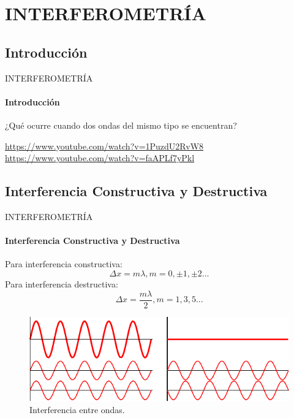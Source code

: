 \section{INTERFEROMETRÍA}

\subsection{Introducción}
\begin{frame}{INTERFEROMETRÍA}
	\framesubtitle{Introducción}

	¿Qué ocurre cuando dos ondas del mismo tipo se encuentran?

	\url{https://www.youtube.com/watch?v=1PuzdU2RvW8}
	\url{https://www.youtube.com/watch?v=faAPLf7yPkl}

\end{frame}



\subsection{Interferencia Constructiva y Destructiva}

\begin{frame}{INTERFEROMETRÍA}
	\framesubtitle{Interferencia Constructiva y Destructiva}
	Para interferencia constructiva:
	\begin{equation}
		\Delta x = m \lambda , m=0, \pm 1, \pm 2...
	\end{equation}
	Para interferencia destructiva:
	\begin{equation}
		\Delta x = \frac{m\lambda}{2} , m=1, 3, 5...
	\end{equation}

  \begin{figure}
    \includegraphics[scale=1]{juanse/interference.pdf}
    \caption{Interferencia entre ondas\footnotemark{}.}
  \end{figure}
  \vspace{-5mm}
\end{frame}



